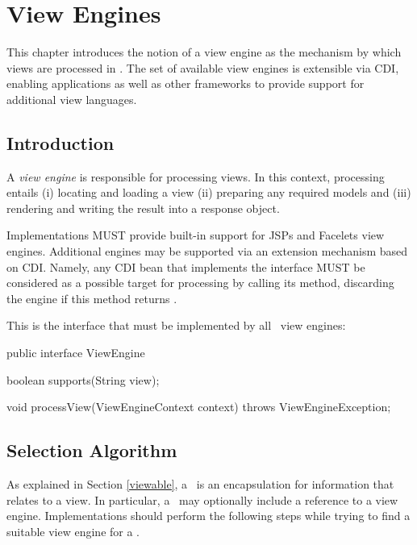 \chapter{View Engines}
\label{view_engines}

This chapter introduces the notion of a view engine as the mechanism by which views
are processed in \mvc. The set of available view engines is extensible via CDI,
enabling applications as well as other frameworks to provide support for additional
view languages.

\section{Introduction}
\label{view_engines_introduction}

A {\em view engine} is responsible for processing views. In this context, processing entails
(i) locating and loading a view (ii) preparing any required models and (iii) rendering and 
writing the result into a response object. 

Implementations MUST provide built-in support for JSPs and Facelets view engines. Additional
engines may be supported via an extension mechanism based on CDI. Namely, any CDI bean
that implements the  interface MUST be considered as
a possible target for processing by calling its  method, discarding the
engine if this method returns .

This is the interface that must be implemented by all \mvc\ view engines:

\begin{listing}{1}
public interface ViewEngine {

    boolean supports(String view);

    void processView(ViewEngineContext context) throws ViewEngineException;
}
\end{listing}

\section{Selection Algorithm}
\label{selection_algorithm}

As explained in Section \ref{viewable}, a \Viewable\ is an encapsulation for information
that relates to a view. In particular, a \Viewable\ may optionally include a reference to a
view engine. Implementations should perform the following steps while trying to find
a suitable view engine for a \Viewable.

